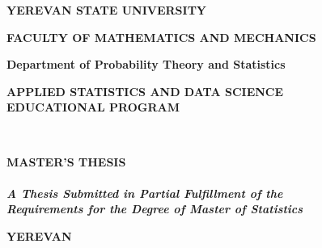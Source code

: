 \setmainfont{DejaVu Sans}

\begin{center}

\fontsize{18pt}{19.2pt} \textbf{\uppercase{Yerevan State University}}\vspace{11.5pt}

\fontsize{18pt}{16.8pt}  \textbf{\uppercase{Faculty of Mathematics and Mechanics
}}\\ 
\vfill

\fontsize{16pt}{16.8pt} \textbf { {Department of Probability Theory and Statistics}}\\

\vfill 
   
\fontsize{17.8pt}{16.8pt} \textbf { \uppercase{Applied Statistics and Data Science} \\ EDUCATIONAL PROGRAM}

\vfill


\fontsize{18pt}{21.6pt} \textbf{\MakeUppercase{\authorNameEng}}\\

\vfill

\fontsize{18pt}{36pt}\textbf{\uppercase{Master's Thesis
}}\\

\vfill
\fontsize{18pt}{21.6pt} \textbf{\MakeUppercase{\thesisTitleEng}}\\

\vfill
\fontsize{13.3pt}{16.8pt} \textbf{\textit{A Thesis Submitted in Partial Fulfillment of the \\ Requirements for the Degree of
Master of Statistics
\\}}

\vfill
\fontsize{13pt}{15.6pt}  \textbf{\uppercase{Yerevan \the\year}}
               
\end{center}
\thispagestyle{empty}
\pagebreak

